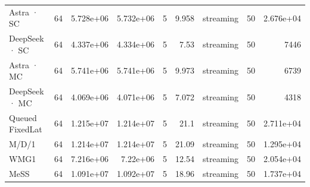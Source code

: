 \begin{tabular}{lrrrrrlrr}
Astra · SC & 64 & 5.728e+06 & 5.732e+06 & 5 & 9.958 & streaming & 50 & 2.676e+04 \\
DeepSeek · SC & 64 & 4.337e+06 & 4.334e+06 & 5 & 7.53 & streaming & 50 & 7446 \\
Astra · MC & 64 & 5.741e+06 & 5.741e+06 & 5 & 9.973 & streaming & 50 & 6739 \\
DeepSeek · MC & 64 & 4.069e+06 & 4.071e+06 & 5 & 7.072 & streaming & 50 & 4318 \\
Queued FixedLat & 64 & 1.215e+07 & 1.214e+07 & 5 & 21.1 & streaming & 50 & 2.711e+04 \\
M/D/1 & 64 & 1.214e+07 & 1.214e+07 & 5 & 21.09 & streaming & 50 & 1.295e+04 \\
WMG1 & 64 & 7.216e+06 & 7.22e+06 & 5 & 12.54 & streaming & 50 & 2.054e+04 \\
MeSS & 64 & 1.091e+07 & 1.092e+07 & 5 & 18.96 & streaming & 50 & 1.737e+04 \\
\bottomrule
\end{tabular}
